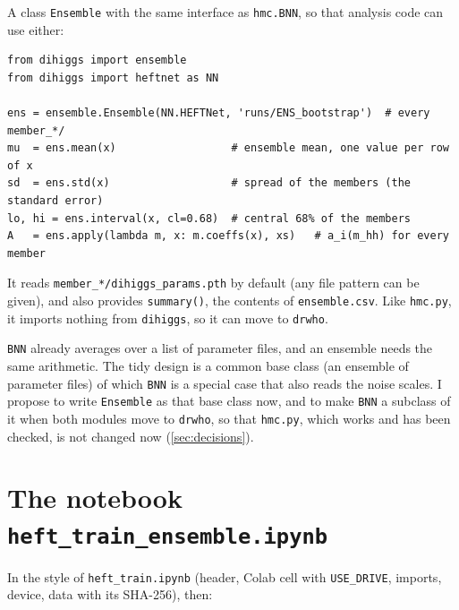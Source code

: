 \documentclass[11pt]{article}
\newcommand{\file}[1]{\nolinkurl{#1}}
\newcommand{\code}[1]{\texttt{#1}}
\begin{document}
A class \code{Ensemble} with the same interface as \code{hmc.BNN}, so that analysis code
can use either:

\begin{lstlisting}
from dihiggs import ensemble
from dihiggs import heftnet as NN

ens = ensemble.Ensemble(NN.HEFTNet, 'runs/ENS_bootstrap')  # every member_*/
mu  = ens.mean(x)                  # ensemble mean, one value per row of x
sd  = ens.std(x)                   # spread of the members (the standard error)
lo, hi = ens.interval(x, cl=0.68)  # central 68% of the members
A   = ens.apply(lambda m, x: m.coeffs(x), xs)   # a_i(m_hh) for every member
\end{lstlisting}

\noindent It reads \file{member_*/dihiggs_params.pth} by default (any file pattern can be
given), and also provides \code{summary()}, the contents of \file{ensemble.csv}. Like
\file{hmc.py}, it imports nothing from \code{dihiggs}, so it can move to \code{drwho}.

\begin{aside}
\code{BNN} already averages over a list of parameter files, and an ensemble needs the same
arithmetic. The tidy design is a common base class (an ensemble of parameter files) of
which \code{BNN} is a special case that also reads the noise scales. I propose to write
\code{Ensemble} as that base class now, and to make \code{BNN} a subclass of it when both
modules move to \code{drwho}, so that \file{hmc.py}, which works and has been checked, is
not changed now (\cref{sec:decisions}).
\end{aside}

\section{The notebook \texttt{heft\_train\_ensemble.ipynb}}
\label{sec:notebook}

In the style of \file{heft_train.ipynb} (header, Colab cell with \code{USE\_DRIVE},
imports, device, data with its SHA-256), then:
\end{document}
